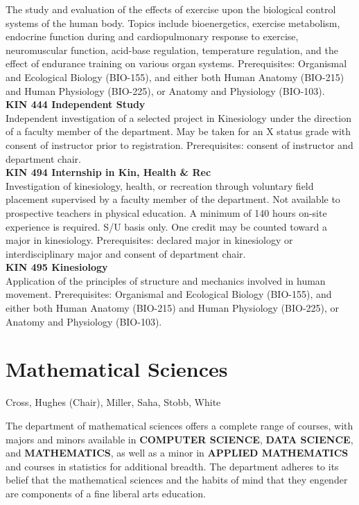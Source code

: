 \documentclass[
  letterpaper,
]{scrbook}
\begin{document}
The study and evaluation of the effects of exercise upon the biological
control systems of the human body. Topics include bioenergetics,
exercise metabolism, endocrine function during and cardiopulmonary
response to exercise, neuromuscular function, acid-base regulation,
temperature regulation, and the effect of endurance training on various
organ systems. Prerequisites: Organismal and Ecological Biology
(BIO-155), and either both Human Anatomy (BIO-215) and Human Physiology
(BIO-225), or Anatomy and Physiology (BIO-103).\\
\textbf{KIN 444 Independent Study}\\
Independent investigation of a selected project in Kinesiology under the
direction of a faculty member of the department. May be taken for an X
status grade with consent of instructor prior to registration.
Prerequisites: consent of instructor and department chair.\\
\textbf{KIN 494 Internship in Kin, Health \& Rec}\\
Investigation of kinesiology, health, or recreation through voluntary
field placement supervised by a faculty member of the department. Not
available to prospective teachers in physical education. A minimum of
140 hours on-site experience is required. S/U basis only. One credit may
be counted toward a major in kinesiology. Prerequisites: declared major
in kinesiology or interdisciplinary major and consent of department
chair.\\
\textbf{KIN 495 Kinesiology}\\
Application of the principles of structure and mechanics involved in
human movement. Prerequisites: Organismal and Ecological Biology
(BIO-155), and either both Human Anatomy (BIO-215) and Human Physiology
(BIO-225), or Anatomy and Physiology (BIO-103).

\section{Mathematical Sciences}\label{sec-mathematical-sciences}

Cross, Hughes (Chair), Miller, Saha, Stobb, White

The department of mathematical sciences offers a complete range of
courses, with majors and minors available in \textbf{COMPUTER SCIENCE},
\textbf{DATA SCIENCE}, and \textbf{MATHEMATICS}, as well as a minor in
\textbf{APPLIED MATHEMATICS} and courses in statistics for additional
breadth. The department adheres to its belief that the mathematical
sciences and the habits of mind that they engender are components of a
fine liberal arts education.
\end{document}
